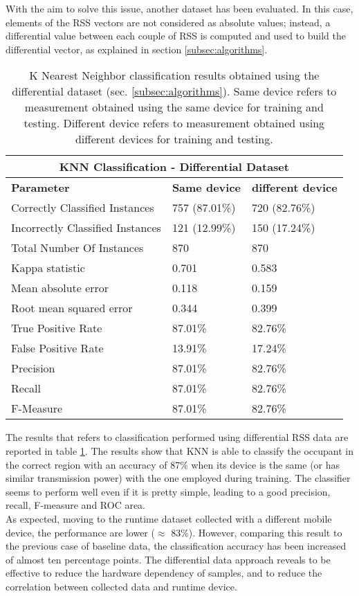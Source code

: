 \medskip
With the aim to solve this issue, another dataset has been evaluated. In this case, elements of the RSS vectors are not considered as absolute values; instead, a differential value between each couple of RSS is computed and used to build the differential vector, as explained in section \ref{subsec:algorithms}.\\
\begin{table}
\center
\caption[K Nearest Neighbor classification results obtained using the differential dataset.]{K Nearest Neighbor classification results obtained using the differential dataset (sec. \ref{subsec:algorithms}). Same device refers to measurement obtained using the same device for training and testing. Different device refers to measurement obtained using different devices for training and testing.}
\label{tab:knn-diff}
\begin{tabular}{ |l|l|l| }
  \hline
  \multicolumn{3}{|c|}{\textbf{KNN Classification - Differential Dataset}} \\
  \hline
  \textbf{Parameter} & \textbf{Same device} & \textbf{different device}\\
  \hline
  Correctly Classified Instances & 757 (87.01\%) & 720 (82.76\%) \\
  Incorrectly Classified Instances & 121 (12.99\%) & 150 (17.24\%) \\
  Total Number Of Instances & 870 & 870 \\
  Kappa statistic & 0.701 & 0.583 \\
  Mean absolute error & 0.118 & 0.159 \\
  Root mean squared error & 0.344 & 0.399 \\
  True Positive Rate & 87.01\% & 82.76\% \\
  False Positive Rate & 13.91\% & 17.24\% \\
  Precision & 87.01\% & 82.76\% \\
  Recall & 87.01\% & 82.76\% \\
  F-Measure & 87.01\% & 82.76\% \\
  \hline
\end{tabular}
\end{table}
The results that refers to classification performed using differential RSS data are reported in table \ref{tab:knn-diff}.
The results show that KNN is able to classify the occupant in the correct region with an accuracy of 87\% when its device is the same (or has similar transmission power) with the one employed during training.
The classifier seems to perform well even if it is pretty simple, leading to a good precision, recall, F-measure and ROC area.\\
As expected, moving to the runtime dataset collected with a different mobile device, the performance are lower ($\approx$ 83\%). However, comparing this result to the previous case of baseline data, the classification accuracy has been increased of almost ten percentage points. The differential data approach reveals to be effective to reduce the hardware dependency of samples, and to reduce the correlation between collected data and runtime device.


